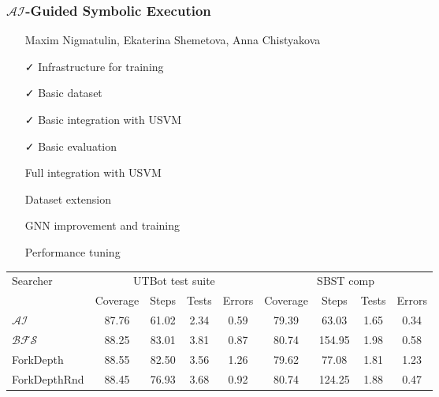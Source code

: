 \documentclass[xcolor=table,aspectratio=169]{beamer}
\begin{document}
\begin{frame}[fragile]
  \frametitle{$\mathcal{AI}$-Guided Symbolic Execution}
  \begin{itemize}
  \item[\faGroup] Maxim Nigmatulin, Ekaterina Shemetova, Anna Chistyakova
  \end{itemize}
  \vspace{0.5cm}
  \begin{minipage}{0.49\textwidth}
  \begin{itemize}
    \item[\faCheck] Infrastructure for training
    \item[\faCheck] Basic dataset
    \item[\faCheck] Basic integration with USVM
    \item[\faCheck] Basic evaluation
  \end{itemize}  
  \end{minipage}
  \begin{minipage}{0.49\textwidth}
  \begin{itemize}
    \item[\faGears] Full integration with USVM
    \item[\faGears] Dataset extension
    \item[\faGears] GNN improvement and training 
    \item[\faGears] Performance tuning
  \end{itemize}  
  \end{minipage}


  \begin{center}  
    \begin{tabular}{|l |c c c c |c c c c|}
      \hline 
      \multirow{2}{*}{Searcher} & \multicolumn{4}{c|}{UTBot test suite} & \multicolumn{4}{c|}{SBST comp} \\
                                & Coverage & Steps                     & Tests                    & Errors             &  Coverage & Steps                    & Tests                   & Errors\\
      \hline 
      $\mathcal{AI}$            &  87.76   & \cellcolor{blue!25} 61.02 &  \cellcolor{blue!25}2.34 & 0.59               &  79.39    & \cellcolor{blue!25}63.03 & \cellcolor{blue!25}1.65 &  0.34 \\
      $\mathcal{BFS}$           &  88.25   &    83.01                  &  3.81                    & 0.87               &  80.74    & 154.95                   &  1.98                   &  0.58 \\
      ForkDepth                 &  88.55   &    82.50                  &  3.56                    & 1.26               &  79.62    & 77.08                    &  1.81                   &  1.23 \\
      ForkDepthRnd              &  88.45   &    76.93                  &  3.68                    & 0.92               &  80.74    & 124.25                   &  1.88                   &  0.47 \\
      \hline 
    \end{tabular}
  \end{center}
  
\end{frame}
\end{document}
